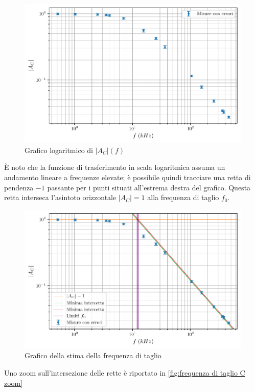 \documentclass[11pt, a4paper]{article}
\numberwithin{equation}{section} %
\begin{document}
\begin{figure}[ht!]
    \includegraphics{onda_sin_AC(f).pdf}
    \caption{Grafico logaritmico di $|A_{C}|(f)$}
    \label{fig:funzione di trasferimento C}
\end{figure}

È noto che la funzione di trasferimento in scala logaritmica assuma un andamento lineare a frequenze elevate; è possibile quindi tracciare una retta di pendenza $-1$ passante per i punti situati all'estrema destra del grafico. Questa retta interseca l'asintoto orizzontale $|A_{C}| = 1$ alla frequenza di taglio $f_{0}$.

\begin{figure}[ht!]
    \includegraphics{onda_sin_AC(f)_taglio.pdf}
    \caption{Grafico della stima della frequenza di taglio}
    \label{fig:frequenza di taglio C}
\end{figure}

Uno zoom sull'intersezione delle rette è riportato in \autoref{fig:frequenza di taglio C zoom}%
\end{document}
